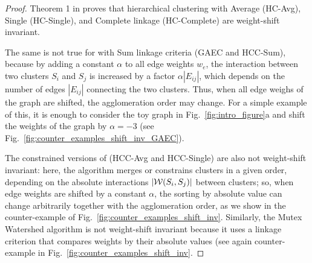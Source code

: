 \invariantAlgs*
\begin{proof}
Theorem 1 in \cite{chehreghani2020hierarchical} proves that hierarchical clustering with Average (HC-Avg), Single (HC-Single), and Complete linkage (HC-Complete) are weight-shift invariant.

The same is not true for \algname{} with Sum linkage criteria (GAEC and HCC-Sum), because by adding a constant $\alpha$ to all edge weights $w_e$, the interaction between two clusters $S_i$ and $S_j$ is increased by a factor $\alpha |E_{ij}|$, which depends on the number of edges  $|E_{ij}|$ connecting the two clusters. Thus, when all edge weighs of the graph are shifted, the agglomeration order may change. For a simple example of this, it is enough to consider the toy graph in Fig.~\ref{fig:intro_figure}a and shift the weights of the graph by $\alpha=-3$ (see Fig.~\ref{fig:counter_examples_shift_inv_GAEC}).


The constrained versions of \algname{} (HCC-Avg and HCC-Single) are also not weight-shift invariant: here, the algorithm merges or constrains clusters in a given order, depending on the absolute interactions $|\mathcal{W}{}(S_i, S_j)|$ between clusters; so, when edge weights are shifted by a constant $\alpha$, the sorting by absolute value can change arbitrarily together with the agglomeration order, as we show in the counter-example of Fig.~\ref{fig:counter_examples_shift_inv}.
Similarly, the Mutex Watershed algorithm is not weight-shift invariant because it uses a linkage criterion that compares weights by their absolute values (see again counter-example in Fig.~\ref{fig:counter_examples_shift_inv}.
\end{proof}


